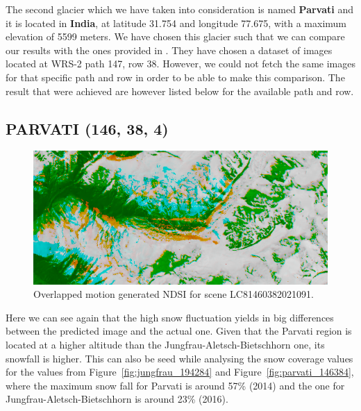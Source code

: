 \documentclass[12pt, a4paper]{report}
\begin{document}
	\vfill
	\newpage{}
	
	\par The second glacier which we have taken into consideration is named \textbf{Parvati} and it is located in \textbf{India}, at latitude 31.754 and longitude 77.675, with a maximum elevation of 5599 meters. We have chosen this glacier such that we can compare our results with the ones provided in \cite{parvati}. They have chosen a dataset of images located at WRS-2 path 147, row 38. However, we could not fetch the same images for that specific path and row in order to be able to make this comparison. The result that were achieved are however listed below for the available path and row.
	
	\subsection{PARVATI (146, 38, 4)}
		
	\begin{figure}[h!]
		\centering
		\includegraphics[width=\linewidth]{../images/experiment_1460384_image.png}
		\caption{Overlapped motion generated NDSI for scene LC81460382021091.}
		\label{fig:experiment_1460384_image}
	\end{figure}

	
	Here we can see again that the high snow fluctuation yields in big differences between the predicted image and the actual one. Given that the Parvati region is located at a higher altitude than the Jungfrau-Aletsch-Bietschhorn one, its snowfall is higher. This can also be seed while analysing the snow coverage values for the values from Figure~\ref{fig:jungfrau_194284} and Figure~\ref{fig:parvati_146384}, where the maximum snow fall for Parvati is around 57\% (2014) and the one for Jungfrau-Aletsch-Bietschhorn is around 23\% (2016).
\end{document}

